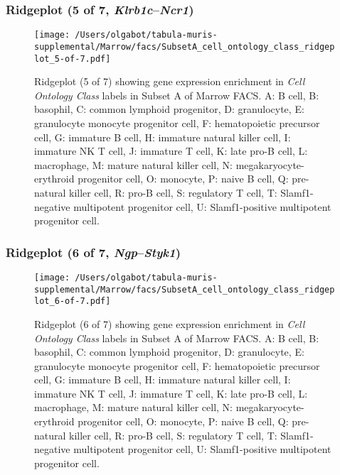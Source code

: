 \subsubsection{Ridgeplot (5 of 7, \emph{Klrb1c}--\emph{Ncr1})}
\begin{figure}[h]
\centering
\texttt{[image: /Users/olgabot/tabula-muris-supplemental/Marrow/facs/SubsetA\_cell\_ontology\_class\_ridgeplot\_5-of-7.pdf]}

\caption{ Ridgeplot (5 of 7)  showing gene expression enrichment in \emph{Cell Ontology Class} labels in Subset A of Marrow FACS. A: B cell, B: basophil, C: common lymphoid progenitor, D: granulocyte, E: granulocyte monocyte progenitor cell, F: hematopoietic precursor cell, G: immature B cell, H: immature natural killer cell, I: immature NK T cell, J: immature T cell, K: late pro-B cell, L: macrophage, M: mature natural killer cell, N: megakaryocyte-erythroid progenitor cell, O: monocyte, P: naive B cell, Q: pre-natural killer cell, R: pro-B cell, S: regulatory T cell, T: Slamf1-negative multipotent progenitor cell, U: Slamf1-positive multipotent progenitor cell.}
\end{figure}


\clearpage

\subsubsection{Ridgeplot (6 of 7, \emph{Ngp}--\emph{Styk1})}
\begin{figure}[h]
\centering
\texttt{[image: /Users/olgabot/tabula-muris-supplemental/Marrow/facs/SubsetA\_cell\_ontology\_class\_ridgeplot\_6-of-7.pdf]}

\caption{ Ridgeplot (6 of 7)  showing gene expression enrichment in \emph{Cell Ontology Class} labels in Subset A of Marrow FACS. A: B cell, B: basophil, C: common lymphoid progenitor, D: granulocyte, E: granulocyte monocyte progenitor cell, F: hematopoietic precursor cell, G: immature B cell, H: immature natural killer cell, I: immature NK T cell, J: immature T cell, K: late pro-B cell, L: macrophage, M: mature natural killer cell, N: megakaryocyte-erythroid progenitor cell, O: monocyte, P: naive B cell, Q: pre-natural killer cell, R: pro-B cell, S: regulatory T cell, T: Slamf1-negative multipotent progenitor cell, U: Slamf1-positive multipotent progenitor cell.}
\end{figure}


\clearpage

